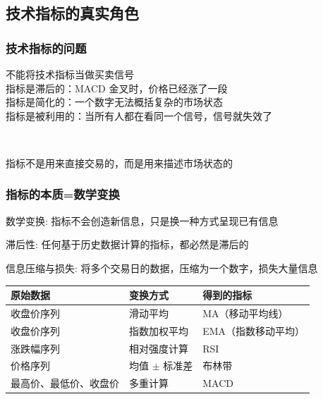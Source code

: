 \subsection{技术指标的真实角色}

\begin{frame}
    \frametitle{技术指标的问题}

    \alert{不能将技术指标当做买卖信号} \\
    \hspace{2em} 指标是滞后的：MACD 金叉时，价格已经涨了一段 \\
    \hspace{2em} 指标是简化的：一个数字无法概括复杂的市场状态 \\
    \hspace{2em} 指标是被利用的：当所有人都在看同一个信号，信号就失效了

    ~\par
    指标不是用来直接交易的，而是用来描述市场状态的
\end{frame}

\begin{frame}
    \frametitle{指标的本质=数学变换}
    
    \alert{数学变换}: 指标不会创造新信息，只是换一种方式呈现已有信息

    \alert{滞后性}: 任何基于历史数据计算的指标，都必然是滞后的

    \alert{信息压缩与损失}: 将多个交易日的数据，压缩为一个数字，损失大量信息

    \begin{table}[htbp]
        \centering
        \begin{tabular}{lll}
            \toprule
            原始数据 & 变换方式 & 得到的指标 \\
            \midrule
            收盘价序列 & 滑动平均 & MA（移动平均线） \\
            收盘价序列 & 指数加权平均 & EMA（指数移动平均） \\
            涨跌幅序列 & 相对强度计算 & RSI \\
            价格序列 & 均值 $\pm$ 标准差 & 布林带 \\
            最高价、最低价、收盘价 & 多重计算 & MACD \\
            \bottomrule
        \end{tabular}
    \end{table}
\end{frame}

